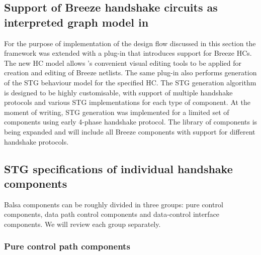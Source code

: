 \subsection{Support of Breeze handshake circuits as interpreted graph model in
}

For the purpose of implementation of the design flow discussed in
this section the  framework was extended with a plug-in
that introduces support for Breeze HCs. The new HC model allows 's
convenient visual editing tools to be applied for creation and editing
of Breeze netlists. The same plug-in also performs generation of the
STG behaviour model for the specified HC. The STG generation algorithm
is designed to be highly customisable, with support of multiple handshake
protocols and various STG implementations for each type of component.
At the moment of writing, STG generation was implemented for a limited
set of components using early 4-phase handshake protocol. The library
of components is being expanded and will include all Breeze components
with support for different handshake protocols.


\subsection{STG specifications of individual handshake components\label{sec:Individual-component-examples}}

Balsa components can be roughly divided in three groups: pure control
components, data path control components and data-control interface
components. We will review each group separately.


\subsubsection{Pure control path components}

\newcommand{\vcent}[1]{
  $\vcenter{\hbox{#1}}$
}
\newcommand{\balsafigSZ}[1]{
\vcent{\texttt{[image: \#1]}}
}

